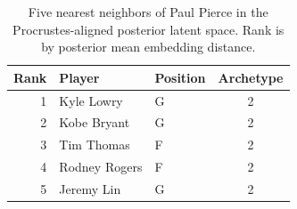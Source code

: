 \begin{table}[htbp]
  \centering\small
  \begin{tabular}{rllc}
    \toprule
    Rank & Player & Position & Archetype \\
    \midrule
    1 & Kyle Lowry & G & 2 \\
    2 & Kobe Bryant & G & 2 \\
    3 & Tim Thomas & F & 2 \\
    4 & Rodney Rogers & F & 2 \\
    5 & Jeremy Lin & G & 2 \\
    \bottomrule
  \end{tabular}
  \caption{Five nearest neighbors of Paul Pierce in the Procrustes-aligned posterior latent space. Rank is by posterior mean embedding distance.}
  \label{tab:Paul_Pierce_neighbors}
\end{table}


